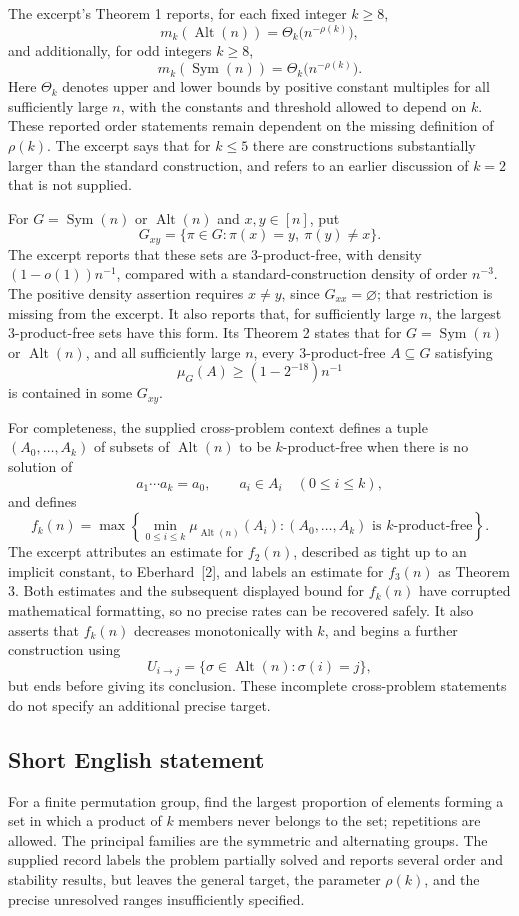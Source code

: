 \documentclass[11pt]{article}
\begin{document}
The excerpt's Theorem 1 reports, for each fixed integer \(k\geq8\),
\[
m_k(\operatorname{Alt}(n))=\Theta_k\bigl(n^{-\rho(k)}\bigr),
\]
and additionally, for odd integers \(k\geq8\),
\[
m_k(\operatorname{Sym}(n))=\Theta_k\bigl(n^{-\rho(k)}\bigr).
\]
Here \(\Theta_k\) denotes upper and lower bounds by positive constant multiples for all sufficiently large \(n\), with the constants and threshold allowed to depend on \(k\). These reported order statements remain dependent on the missing definition of \(\rho(k)\). The excerpt says that for \(k\leq5\) there are constructions substantially larger than the standard construction, and refers to an earlier discussion of \(k=2\) that is not supplied.

For \(G=\operatorname{Sym}(n)\) or \(\operatorname{Alt}(n)\) and \(x,y\in[n]\), put
\[
G_{xy}=\{\pi\in G:\pi(x)=y,\ \pi(y)\ne x\}.
\]
The excerpt reports that these sets are \(3\)-product-free, with density \((1-o(1))n^{-1}\), compared with a standard-construction density of order \(n^{-3}\). The positive density assertion requires \(x\ne y\), since \(G_{xx}=\varnothing\); that restriction is missing from the excerpt. It also reports that, for sufficiently large \(n\), the largest \(3\)-product-free sets have this form. Its Theorem 2 states that for \(G=\operatorname{Sym}(n)\) or \(\operatorname{Alt}(n)\), and all sufficiently large \(n\), every \(3\)-product-free \(A\subseteq G\) satisfying
\[
\mu_G(A)\geq(1-2^{-18})n^{-1}
\]
is contained in some \(G_{xy}\).

For completeness, the supplied cross-problem context defines a tuple \((A_0,\ldots,A_k)\) of subsets of \(\operatorname{Alt}(n)\) to be \(k\)-product-free when there is no solution of
\[
a_1\cdots a_k=a_0,\qquad a_i\in A_i\quad(0\leq i\leq k),
\]
and defines
\[
f_k(n)=\max\left\{\min_{0\leq i\leq k}\mu_{\operatorname{Alt}(n)}(A_i):
(A_0,\ldots,A_k)\text{ is }k\text{-product-free}\right\}.
\]
The excerpt attributes an estimate for \(f_2(n)\), described as tight up to an implicit constant, to Eberhard~[2], and labels an estimate for \(f_3(n)\) as Theorem 3. Both estimates and the subsequent displayed bound for \(f_k(n)\) have corrupted mathematical formatting, so no precise rates can be recovered safely. It also asserts that \(f_k(n)\) decreases monotonically with \(k\), and begins a further construction using
\[
U_{i\to j}=\{\sigma\in\operatorname{Alt}(n):\sigma(i)=j\},
\]
but ends before giving its conclusion. These incomplete cross-problem statements do not specify an additional precise target.
\subsection{Short English statement}
For a finite permutation group, find the largest proportion of elements forming a set in which a product of \(k\) members never belongs to the set; repetitions are allowed. The principal families are the symmetric and alternating groups. The supplied record labels the problem partially solved and reports several order and stability results, but leaves the general target, the parameter \(\rho(k)\), and the precise unresolved ranges insufficiently specified.
\end{document}
